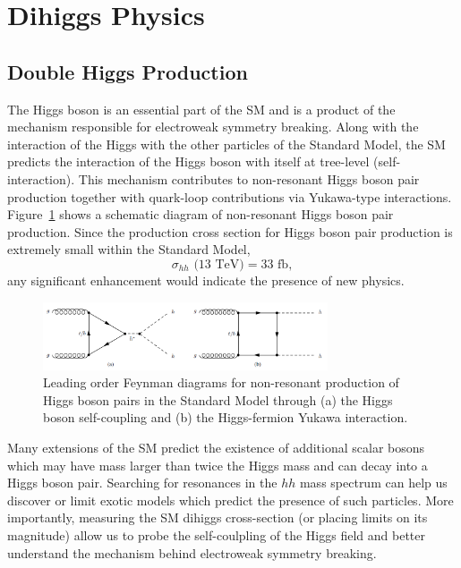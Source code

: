 \section{Dihiggs Physics}
\subsection{Double Higgs Production}
\label{sec:physics}
The Higgs boson is an essential part of the SM and is a product of the mechanism responsible for electroweak symmetry breaking. Along with the interaction of the Higgs with the other particles of the Standard Model, the SM predicts the interaction of the Higgs boson with itself at tree-level (self-interaction). This mechanism contributes to non-resonant Higgs boson pair production together with quark-loop contributions via Yukawa-type interactions. Figure~\ref{fig:nr_hh_production} shows a schematic diagram of non-resonant Higgs boson pair production. Since the production cross section for Higgs boson pair production is extremely small within the Standard Model, 
\begin{equation*}
\sigma_{hh}\text{ (13 TeV)} = 33 \text{ fb},
\end{equation*}
any significant enhancement would indicate the presence of new physics.

\begin{figure}[!h] 
\begin{center}
\includegraphics*[width=0.75\textwidth] {dihiggsPhys/figures/nr-diHiggs-production.png}
\caption{Leading order Feynman diagrams for non-resonant production of Higgs
  boson pairs in the Standard Model through (a) the Higgs boson self-coupling
  and (b) the Higgs-fermion Yukawa interaction.} 
  \label{fig:nr_hh_production}
\end{center}
\end{figure}

Many extensions of the SM predict the existence of additional scalar bosons which may have mass larger than twice the Higgs mass and can decay into a Higgs boson pair. Searching for resonances in the $hh$ mass spectrum can help us discover or limit exotic models which predict the presence of such particles. More importantly, measuring the SM dihiggs cross-section (or placing limits on its magnitude) allow us to probe the self-coulpling of the Higgs field and better understand the mechanism behind electroweak symmetry breaking.

